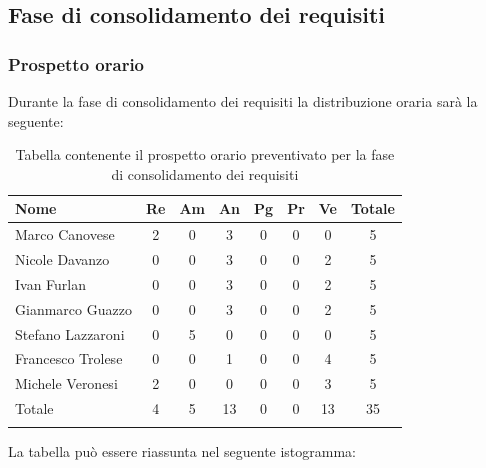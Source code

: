 \subsection{Fase di consolidamento dei requisiti}
\subsubsection{Prospetto orario}
Durante la fase di consolidamento dei requisiti la distribuzione oraria sarà la seguente:

\begin{longtable}{|l|c|c|c|c|c|c|c|}
	\hline
	\rowcolor{lighter-grayer}
	\textbf{Nome}     & \textbf{Re} & \textbf{Am} & \textbf{An} & \textbf{Pg} & \textbf{Pr} & \textbf{Ve} & \textbf{Totale} \\
	\hline
	\endfirsthead

	\hline
	Marco Canovese    & 2           & 0           & 3           & 0           & 0           & 0           & 5               \\
	\hline
	\hline
	Nicole Davanzo    & 0           & 0           & 3           & 0           & 0           & 2           & 5               \\
	\hline
	\hline
	Ivan Furlan       & 0           & 0           & 3           & 0           & 0           & 2           & 5               \\
	\hline
	\hline
	Gianmarco Guazzo  & 0           & 0           & 3           & 0           & 0           & 2           & 5               \\
	\hline
	\hline
	Stefano Lazzaroni & 0           & 5           & 0           & 0           & 0           & 0           & 5               \\
	\hline
	\hline
	Francesco Trolese & 0           & 0           & 1           & 0           & 0           & 4           & 5               \\
	\hline
	\hline
	Michele Veronesi  & 2           & 0           & 0           & 0           & 0           & 3           & 5               \\
	\hline
	\hline
	Totale            & 4           & 5           & 13          & 0           & 0           & 13          & 35              \\
	\hline
	\rowcolor{white}
	\caption{Tabella contenente il prospetto orario preventivato per la fase di consolidamento dei requisiti}
\end{longtable}


La tabella può essere riassunta nel seguente istogramma:

